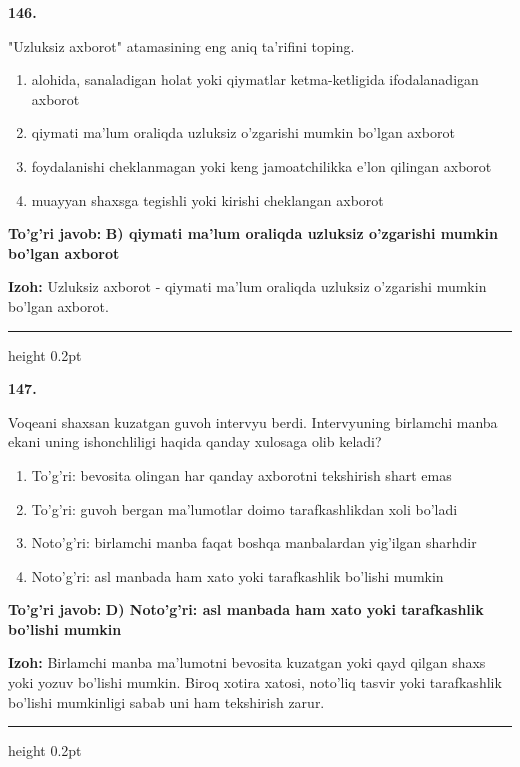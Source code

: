 \documentclass[10pt,a4paper,oneside]{article}
\begin{document}
\noindent\textbf{\color{ink}146.}
\par
"Uzluksiz axborot" atamasining eng aniq ta'rifini toping.
\begin{enumerate}[label=\Alph*),leftmargin=9mm]
\item alohida, sanaladigan holat yoki qiymatlar ketma-ketligida ifodalanadigan axborot
\item qiymati ma'lum oraliqda uzluksiz o'zgarishi mumkin bo'lgan axborot
\item foydalanishi cheklanmagan yoki keng jamoatchilikka e'lon qilingan axborot
\item muayyan shaxsga tegishli yoki kirishi cheklangan axborot
\end{enumerate}
\begin{tcolorbox}[enhanced,breakable,colback=teal!4,colframe=teal!50!black,boxrule=0.5pt,arc=1.1mm,left=3mm,right=3mm,top=1.7mm,bottom=1.7mm,before skip=2mm,after skip=2mm]
\textbf{\color{teal}To'g'ri javob:} \textbf{B) qiymati ma'lum oraliqda uzluksiz o'zgarishi mumkin bo'lgan axborot}
\par\smallskip
\textbf{Izoh:} Uzluksiz axborot - qiymati ma'lum oraliqda uzluksiz o'zgarishi mumkin bo'lgan axborot.
\end{tcolorbox}
\vspace{2mm}\hrule height 0.2pt \vspace{3mm}

\noindent\textbf{\color{ink}147.}
\par
Voqeani shaxsan kuzatgan guvoh intervyu berdi. Intervyuning birlamchi manba ekani uning ishonchliligi haqida qanday xulosaga olib keladi?
\begin{enumerate}[label=\Alph*),leftmargin=9mm]
\item To'g'ri: bevosita olingan har qanday axborotni tekshirish shart emas
\item To'g'ri: guvoh bergan ma'lumotlar doimo tarafkashlikdan xoli bo'ladi
\item Noto'g'ri: birlamchi manba faqat boshqa manbalardan yig'ilgan sharhdir
\item Noto'g'ri: asl manbada ham xato yoki tarafkashlik bo'lishi mumkin
\end{enumerate}
\begin{tcolorbox}[enhanced,breakable,colback=teal!4,colframe=teal!50!black,boxrule=0.5pt,arc=1.1mm,left=3mm,right=3mm,top=1.7mm,bottom=1.7mm,before skip=2mm,after skip=2mm]
\textbf{\color{teal}To'g'ri javob:} \textbf{D) Noto'g'ri: asl manbada ham xato yoki tarafkashlik bo'lishi mumkin}
\par\smallskip
\textbf{Izoh:} Birlamchi manba ma'lumotni bevosita kuzatgan yoki qayd qilgan shaxs yoki yozuv bo'lishi mumkin. Biroq xotira xatosi, noto'liq tasvir yoki tarafkashlik bo'lishi mumkinligi sabab uni ham tekshirish zarur.
\end{tcolorbox}
\vspace{2mm}\hrule height 0.2pt \vspace{3mm}
\end{document}
